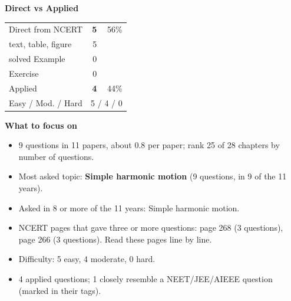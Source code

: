 \begin{minipage}[t]{0.34\linewidth}{\small\textbf{\color{crimson}Direct vs Applied}\par\smallskip
\begin{tabular}{@{}lrr@{}}\toprule
Direct from NCERT & \textbf{5} & 56\%\\
\quad text, table, figure & 5 &\\
\quad solved Example & 0 &\\
\quad Exercise & 0 &\\
Applied & \textbf{4} & 44\%\\\midrule
Easy / Mod. / Hard & \multicolumn{2}{r}{5 / 4 / 0}\\\bottomrule
\end{tabular}}\end{minipage}\hfill
\begin{minipage}[t]{0.63\linewidth}{\small\textbf{\color{crimson}What to focus on}\par\smallskip
\begin{itemize}[leftmargin=1.1em,itemsep=1pt,topsep=0pt]
\item 9 questions in 11 papers, about 0.8 per paper; rank 25 of 28 chapters by number of questions.
\item Most asked topic: \textbf{Simple harmonic motion} (9 questions, in 9 of the 11 years).
\item Asked in 8 or more of the 11 years: Simple harmonic motion.
\item NCERT pages that gave three or more questions: page 268 (3 questions), page 266 (3 questions). Read these pages line by line.
\item Difficulty: 5 easy, 4 moderate, 0 hard.
\item 4 applied questions; 1 closely resemble a NEET/JEE/AIEEE question (marked in their tags).
\end{itemize}}\end{minipage}\par
{}
